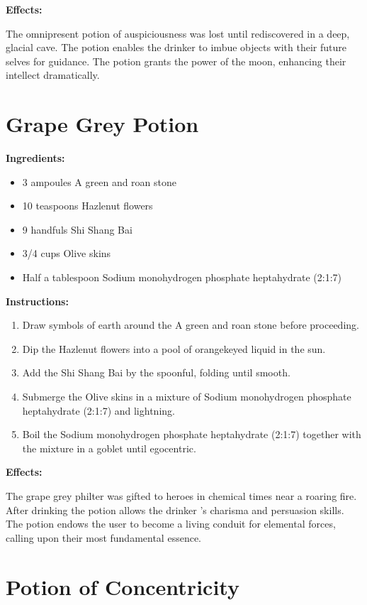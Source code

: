 \documentclass{article}
\begin{document}
\textbf{Effects:}

The omnipresent potion of auspiciousness was lost until rediscovered in a deep, glacial cave. The potion enables the drinker to imbue objects with their future selves for guidance. The potion grants the power of the moon, enhancing their intellect dramatically.

\newpage
\section*{Grape Grey Potion}

\textbf{Ingredients:}

\begin{itemize}
  \item 3 ampoules A green and roan stone
  \item 10 teaspoons Hazlenut flowers
  \item 9 handfuls Shi Shang Bai
  \item 3/4 cups Olive skins
  \item Half a tablespoon Sodium monohydrogen phosphate heptahydrate (2:1:7)
\end{itemize}

\textbf{Instructions:}

\begin{enumerate}
  \item Draw symbols of earth around the A green and roan stone before proceeding.
  \item Dip the Hazlenut flowers into a pool of orangekeyed liquid in the sun.
  \item Add the Shi Shang Bai by the spoonful, folding until smooth.
  \item Submerge the Olive skins in a mixture of Sodium monohydrogen phosphate heptahydrate (2:1:7) and lightning.
  \item Boil the Sodium monohydrogen phosphate heptahydrate (2:1:7) together with the mixture in a goblet until egocentric.
\end{enumerate}

\textbf{Effects:}

The grape grey philter was gifted to heroes in chemical times near a roaring fire. After drinking the potion allows the drinker 's charisma and persuasion skills. The potion endows the user to become a living conduit for elemental forces, calling upon their most fundamental essence.

\newpage
\section*{Potion of Concentricity}
\end{document}
